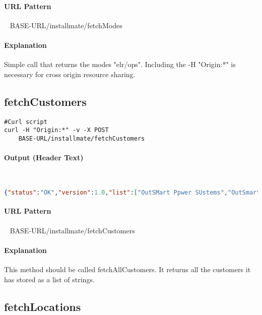 \documentclass[
10pt, %
letterpaper, %
oneside, %
headinclude,footinclude, %
BCOR5mm, %
]{scrartcl}
\begin{document}
\paragraph{URL Pattern} 
~\newline
BASE-URL/installmate/fetchModes

\paragraph{Explanation} Simple call that returns the modes "elr/ops". Including the -H "Origin:*" is necessary for cross origin resource sharing. 



\subsection{\textbf{fetchCustomers}}

\begin{lstlisting}
#Curl script
curl -H "Origin:*" -v -X POST 
	BASE-URL/installmate/fetchCustomers
\end{lstlisting}

\paragraph{Output (Header Text)}~
\begin{lstlisting}[language=json]
{"status":"OK","version":1.0,"list":["OutSMart Ppwer SUstems","OutSmart Power Systems","laber"]}
\end{lstlisting}

\paragraph{URL Pattern} 
~\newline
BASE-URL/installmate/fetchCustomers

\paragraph{Explanation} This method should be called fetchAllCustomers. It returns all the customers it has stored as a list of strings.



\subsection{\textbf{fetchLocations}}
\end{document}
